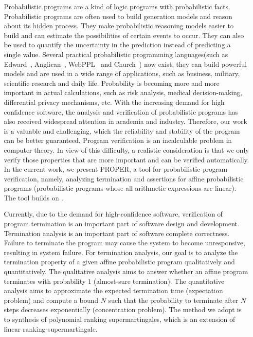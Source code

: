 \documentclass[runningheads]{llncs}
\begin{document}
Probabilistic programs are a kind of logic programs with probabilistic facts. Probabilistic programs are often used to build generation models and reason about its hidden process. They make probabilistic reasoning models easier to build and can estimate the possibilities of certain events to occur. They can also be used to quantify the uncertainty in the prediction instead of predicting a single value. Several practical probabilistic programming languages(such as Edward~\cite{tran2016edward}, Anglican~\cite{Dav2016Design}, WebPPL~\cite{Noah2014language} and Church~\cite{Noah2008language}) now exist, they can build powerful models and are used in a wide range of applications, such as business, military, scientific research and daily life. Probability is becoming more and more important in actual calculations, such as risk analysis, medical decision-making, differential privacy mechanisms, etc. With the increasing demand for high confidence software, the analysis and verification of probabilistic programs has also received widespread attention in academia and industry. Therefore, our work is a valuable and challenging, which the reliability and stability of the program can be better guaranteed. Program verification is an incalculable problem in computer theory. In view of this difficulty, a realistic consideration is that we only verify those properties that are more important and can be verified automatically. In the current work, we present PROPER, a tool for probabilistic program verification, namely, analyzing termination and assertions for affine probabilistic programs (probabilistic programs whose all arithmetic expressions are linear). The tool builds on \cite{kris2016termination,cha2015algorithmic,Sankaranarayanan2013Static}. 

Currently, due to the demand for high-confidence software, verification of program termination is an important part of software design and development. Termination analysis is an important part of software complete correctness. Failure to terminate the program may cause the system to become unresponsive, resulting in system failure. For termination analysis, our goal is to analyze the termination property of a given affine probabilistic program qualitatively and quantitatively. The qualitative analysis aims to answer whether an affine program terminates with probability $1$ (almost-sure termination). The quantitative analysis aims to approximate the expected termination time (expectation problem) and compute a bound $N$ such that the probability to terminate after $N$ steps decreases exponentially (concentration problem). The method we adopt is to synthesis of polynomial ranking supermartingales, which is an extension of linear ranking-supermartingale. 
\end{document}
